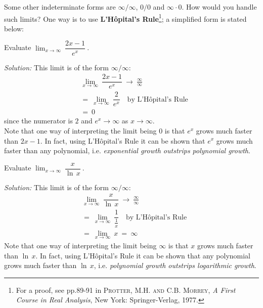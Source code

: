 Some other indeterminate forms are $\infty/\infty$, $0/0$ and $\infty \cdot 0$.
How would you handle such limits? One way is to use
\textbf{L'H\^{o}pital's Rule}\footnote{For a proof,
see pp.89-91 in \textsc{Protter, M.H. and C.B. Morrey}, \emph{A First Course in
Real Analysis}, New York: Springer-Verlag, 1977.}; a simplified form is stated
below:


\begin{exmp}\label{exmp:limxexpx}
\noindent Evaluate $\displaystyle\lim_{x \to \infty}~\dfrac{2x - 1}{e^x}~$.\vspace{1mm}
\par\noindent\emph{Solution:} This limit is of the form $\infty/\infty$:
\begin{align*}
&\lim_{x \to \infty}~\dfrac{2x - 1}{e^x} ~\to~ \frac{\infty}{\infty}\\
&=~ \lim_{x \to \infty}~\dfrac{2}{e^x} \quad\text{by L'H\^{o}pital's Rule}\\
&=~ 0
\end{align*}
since the numerator is $2$ and $e^x \to \infty$ as $x \to \infty$.\\
Note that one way of interpreting the limit being $0$ is that $e^x$ grows much
faster than $2x - 1$. In fact, using L'H\^{o}pital's Rule it can be shown that
$e^x$ grows much faster than any polynomial, i.e. \emph{exponential growth
outstrips polynomial growth}.
\end{exmp}
\divider
\newpage
\begin{exmp}\label{exmp:limxlnx}
\noindent Evaluate $\displaystyle\lim_{x \to \infty}~\dfrac{x}{\ln\,x}~$.\vspace{1mm}
\par\noindent\emph{Solution:} This limit is of the form $\infty/\infty$:
\begin{align*}
&\lim_{x \to \infty}~\dfrac{x}{\ln\,x} ~\to~ \frac{\infty}{\infty}\\
&=~ \lim_{x \to \infty}~\dfrac{1}{\frac{1}{x}} \quad\text{by L'H\^{o}pital's Rule}\\[6pt]
&=~ \lim_{x \to \infty}~x ~=~ \infty
\end{align*}
Note that one way of interpreting the limit being $\infty$ is that $x$ grows
much faster than $\ln\,x$. In fact, using L'H\^{o}pital's Rule it can be shown
that any polynomial grows much faster than $\ln\,x$, i.e. \emph{polynomial
growth outstrips logarithmic growth}.
\end{exmp}
